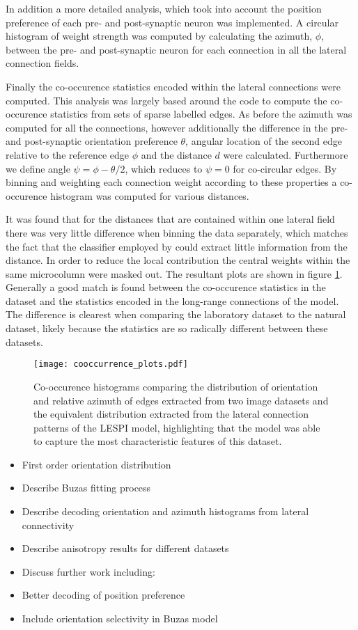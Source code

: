 In addition a more detailed analysis, which took into account the
position preference of each pre- and post-synaptic neuron was
implemented. A circular histogram of weight strength was computed by
calculating the azimuth, $\phi$, between the pre- and post-synaptic
neuron for each connection in all the lateral connection fields.

Finally the co-occurence statistics encoded within the lateral
connections were computed. This analysis was largely based around the
\cite{Perrinet2015} code to compute the co-occurence statistics from
sets of sparse labelled edges. As before the azimuth was computed for
all the connections, however additionally the difference in the pre-
and post-synaptic orientation preference $\theta$, angular location of
the second edge relative to the reference edge $\phi$ and the distance
$d$ were calculated. Furthermore we define angle $\psi = \phi
-\theta/2$, which reduces to $\psi = 0$ for co-circular edges. By
binning and weighting each connection weight according to these
properties a co-occurence histogram was computed for various
distances.

It was found that for the distances that are contained within one
lateral field there was very little difference when binning the data
separately, which matches the fact that the classifier employed by
\cite{Perrinet2015} could extract little information from the
distance. In order to reduce the local contribution the central
weights within the same microcolumn were masked out. The resultant
plots are shown in figure \ref{cooccurrence}. Generally a good match
is found between the co-occurence statistics in the dataset and the
statistics encoded in the long-range connections of the model. The
difference is clearest when comparing the laboratory dataset to the
natural dataset, likely because the statistics are so radically
different between these datasets.

\begin{figure}
	\centering
        \texttt{[image: cooccurrence\_plots.pdf]}
	\caption{Co-occurence histograms comparing the distribution of
          orientation and relative azimuth of edges extracted from two
          image datasets and the equivalent distribution extracted
          from the lateral connection patterns of the LESPI model,
          highlighting that the model was able to capture the most
          characteristic features of this dataset.}
	\label{cooccurrence}
\end{figure}


\begin{itemize}
\item First order orientation distribution
\item Describe Buzas fitting process
\item Describe decoding orientation and azimuth histograms from lateral
  connectivity
\item Describe anisotropy results for different datasets
\item Discuss further work including:
\item Better decoding of position preference
\item Include orientation selectivity in Buzas model
\end{itemize}
